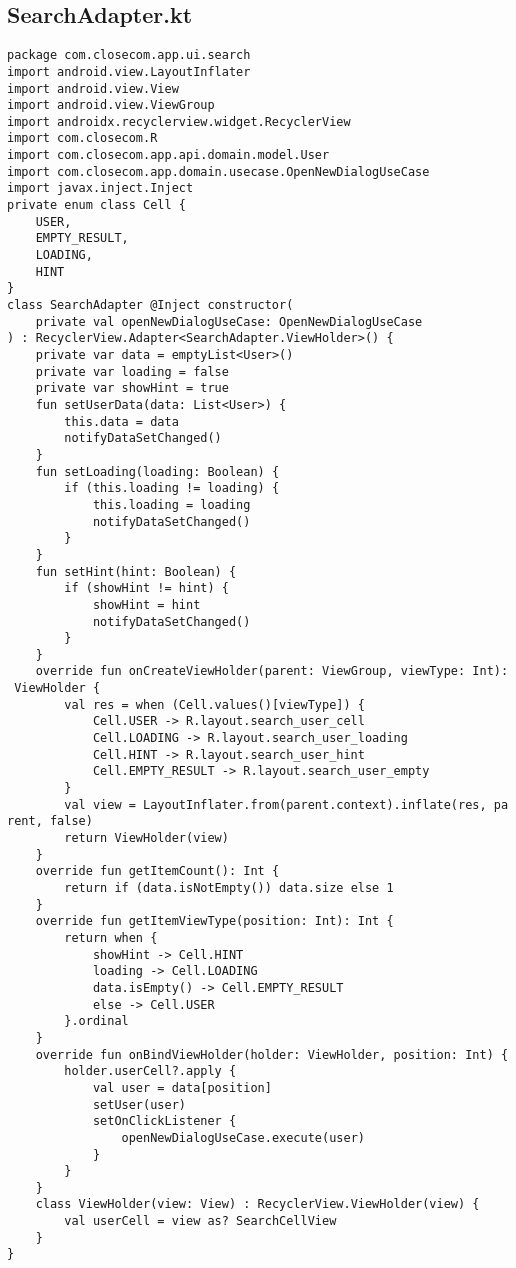 \documentclass[listing]{espd}
\begin{document}
\subsection{SearchAdapter.kt}
\begin{verbatim}
package com.closecom.app.ui.search
import android.view.LayoutInflater
import android.view.View
import android.view.ViewGroup
import androidx.recyclerview.widget.RecyclerView
import com.closecom.R
import com.closecom.app.api.domain.model.User
import com.closecom.app.domain.usecase.OpenNewDialogUseCase
import javax.inject.Inject
private enum class Cell {
    USER,
    EMPTY_RESULT,
    LOADING,
    HINT
}
class SearchAdapter @Inject constructor(
    private val openNewDialogUseCase: OpenNewDialogUseCase
) : RecyclerView.Adapter<SearchAdapter.ViewHolder>() {
    private var data = emptyList<User>()
    private var loading = false
    private var showHint = true
    fun setUserData(data: List<User>) {
        this.data = data
        notifyDataSetChanged()
    }
    fun setLoading(loading: Boolean) {
        if (this.loading != loading) {
            this.loading = loading
            notifyDataSetChanged()
        }
    }
    fun setHint(hint: Boolean) {
        if (showHint != hint) {
            showHint = hint
            notifyDataSetChanged()
        }
    }
    override fun onCreateViewHolder(parent: ViewGroup, viewType: Int):
 ViewHolder {
        val res = when (Cell.values()[viewType]) {
            Cell.USER -> R.layout.search_user_cell
            Cell.LOADING -> R.layout.search_user_loading
            Cell.HINT -> R.layout.search_user_hint
            Cell.EMPTY_RESULT -> R.layout.search_user_empty
        }
        val view = LayoutInflater.from(parent.context).inflate(res, pa
rent, false)
        return ViewHolder(view)
    }
    override fun getItemCount(): Int {
        return if (data.isNotEmpty()) data.size else 1
    }
    override fun getItemViewType(position: Int): Int {
        return when {
            showHint -> Cell.HINT
            loading -> Cell.LOADING
            data.isEmpty() -> Cell.EMPTY_RESULT
            else -> Cell.USER
        }.ordinal
    }
    override fun onBindViewHolder(holder: ViewHolder, position: Int) {
        holder.userCell?.apply {
            val user = data[position]
            setUser(user)
            setOnClickListener {
                openNewDialogUseCase.execute(user)
            }
        }
    }
    class ViewHolder(view: View) : RecyclerView.ViewHolder(view) {
        val userCell = view as? SearchCellView
    }
}
\end{verbatim}
\end{document}
